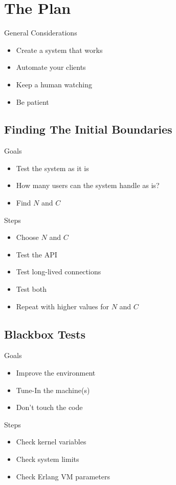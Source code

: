 \documentclass[utf8]{beamer}
\begin{document}
\section{The Plan}
\begin{frame}
\end{frame}

\begin{frame}{General Considerations}
	\begin{itemize}
		\item<1,5> Create a system that \alert{works}
		\item<2,5> Automate your clients
		\item<3,5> Keep a human watching
		\item<4,5> Be patient
	\end{itemize}
\end{frame}

\subsection{Finding The Initial Boundaries}
\begin{frame}{Goals}
	\begin{itemize}
		\item Test the system as it is
		\item How many users can the system handle \alert{as is}?
		\item Find $N$ and $C$
	\end{itemize}
\end{frame}
\begin{frame}{Steps}
	\begin{itemize}
		\item Choose $N$ and $C$
		\item Test the API
		\item Test long-lived connections
		\item Test both
		\pause
		\item Repeat with higher values for $N$ and $C$
	\end{itemize}
\end{frame}

\subsection{Blackbox Tests}
\begin{frame}{Goals}
	\begin{itemize}
		\item Improve the environment
		\item Tune-In the machine(s)
		\item \alert{Don't} touch the code
	\end{itemize}
\end{frame}
\begin{frame}{Steps}
	\begin{itemize}
		\item Check kernel variables
		\item Check system limits
		\item Check Erlang VM parameters
	\end{itemize}
\end{frame}
\end{document}
